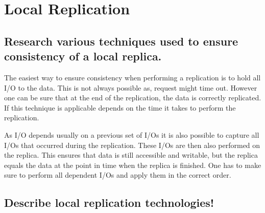 \section{Local Replication} %
\label{sec:local_replication}

\subsection{Research various techniques used to ensure consistency of a local replica.} %
\label{sub:research_various_techniques_used_to_ensure_consistency_of_a_local_replica}
	The easiest way to ensure consistency when performing a replication
	is to hold all I/O to the data.
	This is not always possible as,
	request might time out.
	However one can be sure that at the end of the replication,
	the data is correctly replicated.
	If this technique is applicable depends on the time it
	takes to perform the replication.

	As I/O depends usually on a previous set of I/Os
	it is also possible to capture all I/Os that occurred during the replication.
	These I/Os are then also performed on the replica.
	This ensures that data is still accessible and writable,
	but the replica equals the data at the point in time
	when the replica is finished.
	One has to make sure to perform all dependent I/Os
	and apply them in the correct order.

\subsection{Describe local replication technologies!} %
\label{sub:describe_local_replication_technologies}

